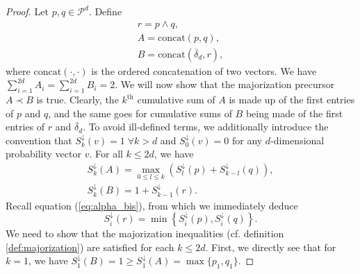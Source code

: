 \begin{proof}
    Let $p, q \in \mathcal{P}^d$. Define 
    \begin{gather}
        r = p \wedge q,\\
        A = \text{concat}(p, q),\\
        B = \text{concat}(\overline{\delta}_d, r),
    \end{gather}
    where $\text{concat}(\cdot, \cdot)$ is the ordered concatenation of two vectors. We have $\sum_{i=1}^{2d} A_i = \sum_{i=1}^{2d} B_i = 2$. We will now show that the majorization precursor $A \prec B$ is true. Clearly, the $k^{\text{th}}$ cumulative sum of $A$ is made up of the first entries of $p$ and $q$, and the same goes for cumulative sums of $B$ being made of the first entries of $r$ and $\overline{\delta}_d$. To avoid ill-defined terms, we additionally introduce the convention that $S^\downarrow_k (v) = 1 \; \forall k > d$ and $S^\downarrow_0(v) = 0$ for any $d$-dimensional probability vector $v$. For all $k \leq 2d$, we have
    \begin{gather}
        S^\downarrow_k (A) = \max_{0\leq l\leq k} \left(S^\downarrow_l (p) + S^\downarrow_{k-l} (q)\right), \\
        S^\downarrow_k (B) = 1 + S^\downarrow_{k-1}(r).
    \end{gather} %
    Recall equation (\ref{eq:alpha_bis}), from which we immediately deduce
    \begin{equation}
        S^\downarrow_i (r) = \min \left\{S^\downarrow_i (p), S^\downarrow_i (q)\right\}.
    \end{equation}
    We need to show that the majorization inequalities (cf. definition \ref{def:majorization}) are satisfied for each $k \leq 2d$. First, we directly see that for $k = 1$, we have $S^\downarrow_1(B) = 1 \geq S^\downarrow_1(A) = \max \{p_1, q_1\}$. 
    

\end{proof}

